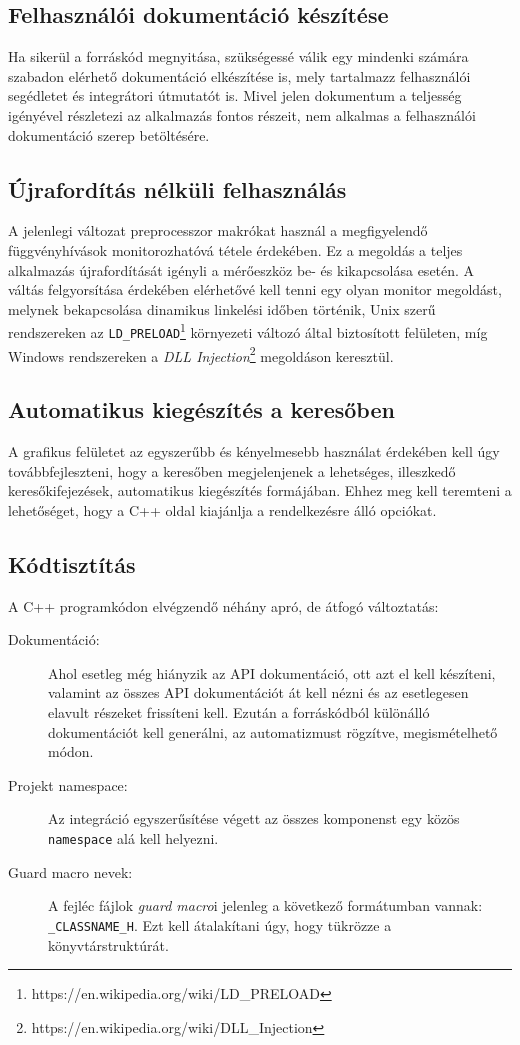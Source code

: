     \subsection{Felhasználói dokumentáció készítése}
    Ha sikerül a forráskód megnyitása, szükségessé válik egy mindenki számára szabadon elérhető dokumentáció elkészítése is, mely tartalmazz felhasználói segédletet és integrátori útmutatót is. Mivel jelen dokumentum a teljesség igényével részletezi az alkalmazás fontos részeit, nem alkalmas a felhasználói dokumentáció szerep betöltésére.
    
    \subsection{Újrafordítás nélküli felhasználás}
    A jelenlegi változat preprocesszor makrókat használ a megfigyelendő függvényhívások monitorozhatóvá tétele érdekében. Ez a megoldás a teljes alkalmazás újrafordítását igényli a mérőeszköz be- és kikapcsolása esetén. A váltás felgyorsítása érdekében elérhetővé kell tenni egy olyan monitor megoldást, melynek bekapcsolása dinamikus linkelési időben történik, Unix szerű rendszereken az \texttt{LD\_PRELOAD}\footnote{https://en.wikipedia.org/wiki/LD\_PRELOAD} környezeti változó által biztosított felületen, míg Windows rendszereken a \emph{DLL Injection}\footnote{https://en.wikipedia.org/wiki/DLL\_Injection} megoldáson keresztül.
    
    \subsection{Automatikus kiegészítés a keresőben}
    A grafikus felületet az egyszerűbb és kényelmesebb használat érdekében kell úgy továbbfejleszteni, hogy a keresőben megjelenjenek a lehetséges, illeszkedő keresőkifejezések, automatikus kiegészítés formájában. Ehhez meg kell teremteni a lehetőséget, hogy a C++ oldal kiajánlja a rendelkezésre álló opciókat.
    
    \subsection{Kódtisztítás}
    A C++ programkódon elvégzendő néhány apró, de átfogó változtatás:

    \begin{description}
        \item[Dokumentáció:] Ahol esetleg még hiányzik az API dokumentáció, ott azt el kell készíteni, valamint az összes API dokumentációt át kell nézni és az esetlegesen elavult részeket frissíteni kell. Ezután a forráskódból különálló dokumentációt kell generálni, az automatizmust rögzítve, megismételhető módon.
        
        \item[Projekt namespace:] Az integráció egyszerűsítése végett az összes komponenst egy közös \texttt{namespace} alá kell helyezni.
        
        \item[Guard macro nevek:] A fejléc fájlok \emph{guard macro}i jelenleg a következő formátumban vannak: \texttt{\_CLASSNAME\_H}. Ezt kell átalakítani úgy, hogy tükrözze a könyvtárstruktúrát.

    \end{description}
